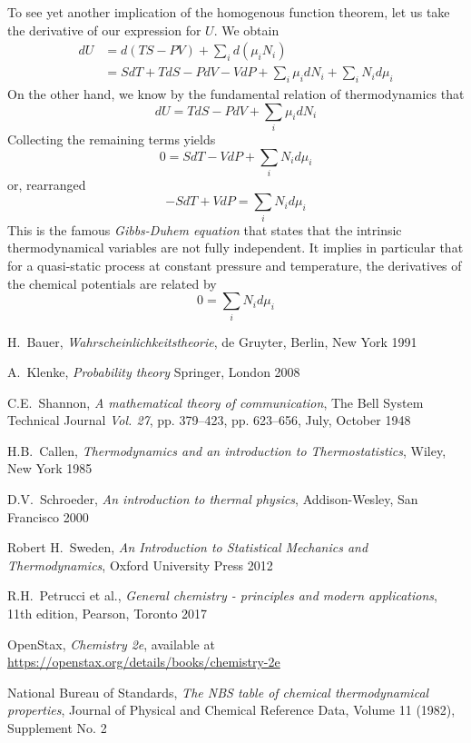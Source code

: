 \documentclass[a4paper, draft]{article}
\theoremstyle{own}
\theoremstyle{remark}
\begin{document}
To see yet another implication of the homogenous function theorem, let us take the derivative of our expression for $U$. We obtain
\begin{align*}
dU &= d(TS - PV) + \sum_i d(\mu_i N_i) \\
&= S dT + T dS - P dV - V dP + \sum_i \mu_i dN_i + \sum_i N_i d\mu_i 
\end{align*}
On the other hand, we know by the fundamental relation of thermodynamics that
$$
dU = T dS - P dV  + \sum_i \mu_i dN_i 
$$
Collecting the remaining terms yields
$$
0 = S dT  - V dP + \sum_i N_i d\mu_i 
$$
or, rearranged
$$
- S dT  + V dP = \sum_i N_i d\mu_i 
$$
This is the famous {\em Gibbs-Duhem equation} that states that the intrinsic thermodynamical variables are not fully independent. It implies in particular that for a quasi-static process at constant pressure and temperature, the derivatives of the chemical potentials are related by
$$
0 = \sum_i N_i d\mu_i 
$$



\begin{thebibliography}{9}
	
H.~Bauer,
{\em Wahrscheinlichkeitstheorie},
de Gruyter, Berlin, New York 1991
	
A.~Klenke,
{\em Probability theory}
Springer, London 2008


C.E.~Shannon,
{\em A mathematical theory of communication}, 
The Bell System Technical Journal {\em Vol. 27}, pp. 379--423, pp. 623--656, July, October 1948



H.B.~Callen,
{\em Thermodynamics and an introduction to Thermostatistics},
Wiley, New York 1985


D.V.~Schroeder,
{\em An introduction to thermal physics},
Addison-Wesley, San Francisco 2000

Robert H.~Sweden,
{\em An Introduction to Statistical Mechanics and Thermodynamics}, Oxford University Press 2012

R.H.~Petrucci et al., 
{\em General chemistry - principles and modern applications}, 11th edition, Pearson, Toronto 2017

OpenStax, {\em Chemistry 2e}, available at \url{https://openstax.org/details/books/chemistry-2e}

National Bureau of Standards, {\em The NBS table of chemical thermodynamical properties}, Journal of Physical and Chemical Reference Data, Volume 11 (1982), Supplement No. 2

\end{thebibliography}
\end{document}
